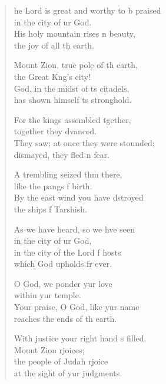 \settowidth{\versewidth}{The Lord is great and worthy to be praised *}
\begin{verse}%
  \begin{patverse}
    he Lord is great and worthy to b praised\Med\\
in the city of ur God.\\
His holy mountain rises \pointup{\i}n beauty,\Med\\
the joy of all th earth.

Mount Zion, true pole of th earth,\Med\\
the Great K\pointup{\i}ng’s city!\\
God, in the midst of \pointup{\i}ts citadels,\Med\\
has shown himself \pointup{\i}ts stronghold.

For the kings assembled tgether,\Med\\
together they dvanced.\\
They saw; at once they were stounded;\Med\\
dismayed, they fled \pointup{\i}n fear.

A trembling seized thm there,\Med\\
like the pangs f birth.\\
By the east wind you have dstroyed\Med\\
the ships f Tarshish.

As we have heard, so we hve seen\Med\\
in the city of ur God,\\
in the city of the Lord f hosts\Med\\
which God upholds fr ever.

O God, we ponder yur love\Med\\
within yur temple.\\
Your praise, O God, like yur name\Med\\
reaches the ends of th earth.

With justice your right hand \pointup{\i}s filled.\Med\\
Mount Zion rjoices;\\
the people of Judah rjoice\Med\\
at the sight of yur judgments.


\end{patverse}
\end{verse}
